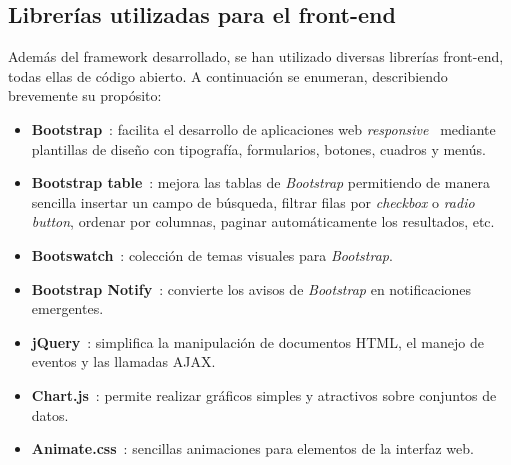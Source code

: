\subsection*{Librerías utilizadas para el \gls{front-end}\label{ssec:dp:front-end-libs}}

Además del \gls{framework} desarrollado, se han utilizado diversas librerías \gls{front-end}, todas ellas de código abierto. A continuación se enumeran, describiendo brevemente su propósito:

\begin{itemize}
  \item \textbf{Bootstrap}~\cite{bootstrap}: facilita el desarrollo de aplicaciones web \textit{responsive}~\cite{responsive} mediante plantillas de diseño con tipografía, formularios, botones, cuadros y menús.

  \item \textbf{Bootstrap table}~\cite{bootstraptable}: mejora las tablas de \textit{Bootstrap} permitiendo de manera sencilla insertar un campo de búsqueda, filtrar filas por \textit{checkbox} o \textit{radio button}, ordenar por columnas, paginar automáticamente los resultados, etc.

  \item \textbf{Bootswatch}~\cite{bootswatch}: colección de temas visuales para \textit{Bootstrap}.

  \item \textbf{Bootstrap Notify}~\cite{bootstrapnotify}: convierte los avisos de \textit{Bootstrap} en notificaciones emergentes.

  \item \textbf{jQuery}~\cite{jquery}: simplifica la manipulación de documentos \gls{HTML}, el manejo de eventos y las llamadas \gls{AJAX}.

  \item \textbf{Chart.js}~\cite{chartjs}: permite realizar gráficos simples y atractivos sobre conjuntos de datos.

  \item \textbf{Animate.css}~\cite{animatecss}: sencillas animaciones para elementos de la interfaz web.

\end{itemize}